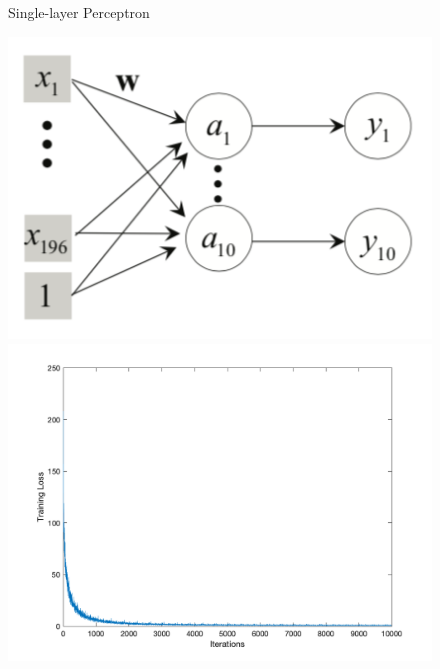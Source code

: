 \documentclass[letter, 11pt]{article}
\begin{document}
\begin{figure}[H]
    \endminipage\hfill
    \caption{Single-layer Perceptron}
\end{figure}

\begin{figure}[H]
        \centering
        \includegraphics[width=\textwidth]{HW4/RESULT/SLP_linear.png}
    \endminipage\hfill
        \centering
        \includegraphics[width=1.1\textwidth]{HW4/RESULT/SLP_linear_loss.png}
    \endminipage\hfill
        \centering

\end{figure}
\end{document}
